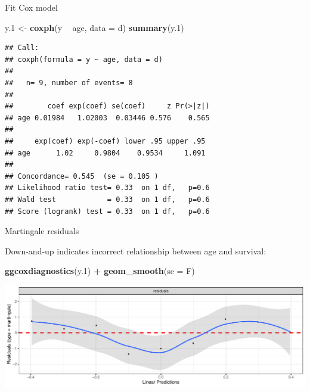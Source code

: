 \documentclass[
  ignorenonframetext,
]{beamer}
\newenvironment{Shaded}{\begin{snugshade}}{\end{snugshade}}
\newcommand{\DataTypeTok}[1]{\textcolor[rgb]{0.13,0.29,0.53}{#1}}
\newcommand{\FloatTok}[1]{\textcolor[rgb]{0.00,0.00,0.81}{#1}}
\newcommand{\KeywordTok}[1]{\textcolor[rgb]{0.13,0.29,0.53}{\textbf{#1}}}
\newcommand{\NormalTok}[1]{#1}
\newcommand{\OperatorTok}[1]{\textcolor[rgb]{0.81,0.36,0.00}{\textbf{#1}}}
\newcommand{\StringTok}[1]{\textcolor[rgb]{0.31,0.60,0.02}{#1}}
\begin{document}
\begin{frame}[fragile]{Fit Cox model}
\protect\hypertarget{fit-cox-model}{}

\footnotesize

\begin{Shaded}
\begin{Highlighting}[]
\NormalTok{y}\FloatTok{.1}\NormalTok{ <-}\StringTok{ }\KeywordTok{coxph}\NormalTok{(y }\OperatorTok{~}\StringTok{ }\NormalTok{age, }\DataTypeTok{data =}\NormalTok{ d)}
\KeywordTok{summary}\NormalTok{(y}\FloatTok{.1}\NormalTok{)}
\end{Highlighting}
\end{Shaded}

\begin{verbatim}
## Call:
## coxph(formula = y ~ age, data = d)
## 
##   n= 9, number of events= 8 
## 
##        coef exp(coef) se(coef)     z Pr(>|z|)
## age 0.01984   1.02003  0.03446 0.576    0.565
## 
##     exp(coef) exp(-coef) lower .95 upper .95
## age      1.02     0.9804    0.9534     1.091
## 
## Concordance= 0.545  (se = 0.105 )
## Likelihood ratio test= 0.33  on 1 df,   p=0.6
## Wald test            = 0.33  on 1 df,   p=0.6
## Score (logrank) test = 0.33  on 1 df,   p=0.6
\end{verbatim}

\normalsize

\end{frame}

\begin{frame}[fragile]{Martingale residuals}
\protect\hypertarget{martingale-residuals}{}

Down-and-up indicates incorrect relationship between age and survival:

\begin{Shaded}
\begin{Highlighting}[]
\KeywordTok{ggcoxdiagnostics}\NormalTok{(y}\FloatTok{.1}\NormalTok{) }\OperatorTok{+}\StringTok{ }\KeywordTok{geom_smooth}\NormalTok{(}\DataTypeTok{se =}\NormalTok{ F)}
\end{Highlighting}
\end{Shaded}

\includegraphics{slides_d29_files/figure-beamer/unnamed-chunk-184-1.pdf}

\end{frame}
\end{document}
